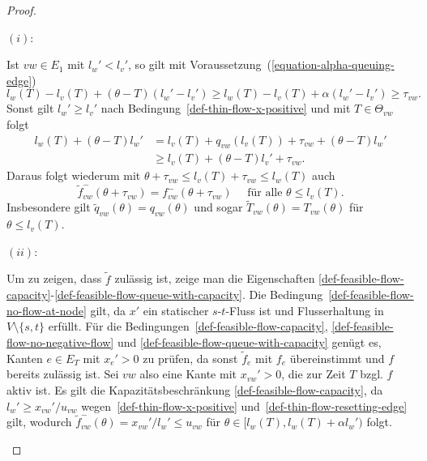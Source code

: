 \begin{proof}
	\begin{description}[leftmargin=0cm, topsep=0cm, itemindent=0.5cm]
		\item[Zu] $(i)$:
		
		Ist $vw\in E_1$ mit $l_w'<l_v'$, so gilt mit Voraussetzung~(\ref{equation-alpha-queuing-edge})
		\[
		l_w(T)-l_v(T) + (\theta - T)(l_w' - l_v') \geq l_w(T)-l_v(T)+\alpha(l_w'- l_v')\geq \tau_{vw}.
		\]
		Sonst gilt $l_w' \geq l_v'$ nach Bedingung~\ref{def-thin-flow-x-positive} und mit $T\in \Theta_{vw}$ folgt \begin{align*}
		l_w(T)+(\theta-T)l_w' &= l_v(T) + q_{vw}(l_v(T))+\tau_{vw}+(\theta - T)l_w'\\
		&\geq l_v(T) + (\theta-T)l_v'+\tau_{vw}.
		\end{align*}
		Daraus folgt wiederum mit $\theta + \tau_{vw} \leq l_v(T) + \tau_{vw} \leq l_w(T)$ auch \[ 
		\tilde{f}_{vw}^-(\theta + \tau_{vw}) = f_{vw}^-(\theta + \tau_{vw}) \text{~~~ für alle $\theta\leq l_v(T)$}.
		\]
		Insbesondere gilt $\tilde{q}_{vw}(\theta) = q_{vw}(\theta)$ und sogar $ \tilde{T}_{vw}(\theta)= T_{vw}(\theta)$ für $\theta \leq l_v(T)$.
		
		\item[Zu] $(ii)$:
		
		Um zu zeigen, dass $\tilde{f}$ zulässig ist, zeige man die Eigenschaften \ref{def-feasible-flow-capacity}-\ref{def-feasible-flow-queue-with-capacity}.
		Die Bedingung~\ref{def-feasible-flow-no-flow-at-node} gilt, da $x'$ ein statischer $s$-$t$-Fluss ist und Flusserhaltung in $V\setminus \{ s, t \}$ erfüllt.
		Für die Bedingungen~\ref{def-feasible-flow-capacity}, \ref{def-feasible-flow-no-negative-flow} und \ref{def-feasible-flow-queue-with-capacity} genügt es, Kanten $e\in E_T$ mit $x_e' > 0$ zu prüfen, da sonst $\tilde{f}_e$ mit $f_e$ übereinstimmt und $f$ bereits zulässig ist.
		Sei $vw$ also eine Kante mit $x_{vw}' > 0$, die zur Zeit $T$ bzgl. $f$ aktiv ist.
		Es gilt die Kapazitätsbeschränkung \ref{def-feasible-flow-capacity}, da $l_w'\geq x_{vw}' / u_{vw}$ wegen~\ref{def-thin-flow-x-positive} und~\ref{def-thin-flow-resetting-edge} gilt, wodurch $\tilde{f}^-_{vw}(\theta)=x_{vw}'/l_w'\leq u_{vw}$ für $\theta\in[l_w(T), l_w(T)+\alpha l_w')$ folgt.
		

\end{description}
\end{proof}
